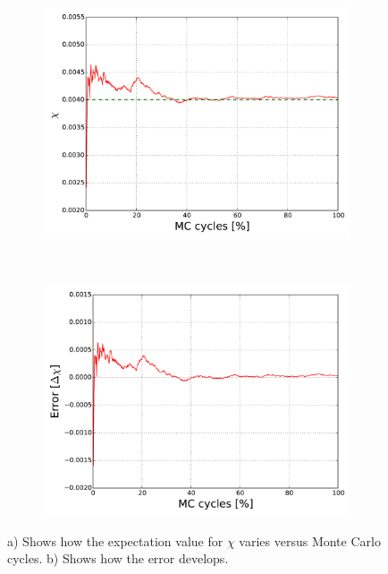 \begin{figure}[H]
    \centering
    \begin{subfigure}{0.5\textwidth}
        \centering
        \includegraphics[width=\linewidth]{result/bilder/2x2/chi22}
        \caption{}
    \end{subfigure}%
    ~ 
    \begin{subfigure}{0.5\textwidth}
        \centering
        \includegraphics[width=\linewidth]{result/bilder/2x2/chierror22}
        \caption{}
    \end{subfigure}
    \caption{a) Shows how the expectation value for $\chi$ varies versus Monte Carlo cycles. b) Shows how the error develops.}
    \label{fig:22-chi}
\end{figure}



















